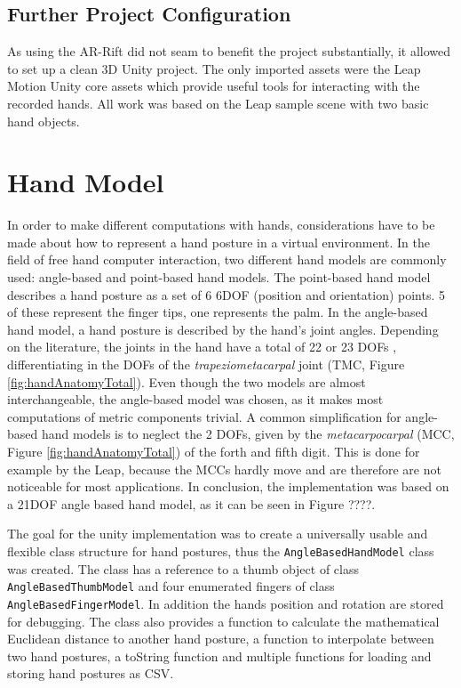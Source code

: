 \subsection{Further Project Configuration}

As using the AR-Rift did not seam to benefit the project substantially, it allowed to set up a clean 3D Unity project. The only imported assets were the Leap Motion Unity core assets which provide useful tools for interacting with the recorded hands. All work was based on the Leap sample scene with two basic hand objects. 

\section{Hand Model}

In order to make different computations with hands, considerations have to be made about how to represent a hand posture in a virtual environment. In the field of free hand computer interaction, two different hand models are commonly used: angle-based and point-based hand models.
The point-based hand model describes a hand posture as a set of 6 6DOF (position and orientation) points. 5 of these represent the finger tips, one represents the palm. In the angle-based hand model, a hand posture is described by the hand's joint angles. Depending on the literature, the joints in the hand have a total of 22 \cite{su1994logical} or 23 DOFs \cite{laviola1999survey}, differentiating in the DOFs of the \textit{trapeziometacarpal} joint (TMC, Figure \ref{fig:handAnatomyTotal}).
Even though the two models are almost interchangeable, the angle-based model was chosen, as it makes most computations of metric components trivial. A common simplification for angle-based hand models is to neglect the 2 DOFs, given by the \textit{metacarpocarpal} (MCC, Figure \ref{fig:handAnatomyTotal}) of the forth and fifth digit. This is done for example by the Leap, because the MCCs hardly move and are therefore are not noticeable for most applications. 
In conclusion, the implementation was based on a 21DOF angle based hand model, as it can be seen in \textcolor[rgb]{1,0,0}{Figure ????}.

The goal for the unity implementation was to create a universally usable and flexible class structure for hand postures, thus the \texttt{AngleBasedHandModel} class was created. The class has a reference to a thumb object of class \texttt{AngleBasedThumbModel} and four enumerated fingers of class \texttt{AngleBasedFingerModel}. In addition the hands position and rotation are stored for debugging. The class also provides a function to calculate the mathematical Euclidean distance to another hand posture, a function to interpolate between two hand postures, a toString function and multiple functions for loading and storing hand postures as CSV. 


